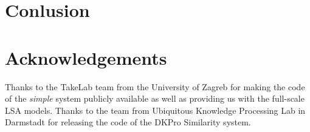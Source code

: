 \documentclass[11pt,letterpaper]{article}
\begin{document}
\section{Conlusion}


\section*{Acknowledgements}

Thanks to the TakeLab team from the University of Zagreb for making
the code of the \emph{simple} system publicly available as well as
providing us with the full-scale LSA models. Thanks to the team from
Ubiquitous Knowledge Processing Lab in Darmstadt for releasing the
code of the DKPro Similarity system.




\end{document}
